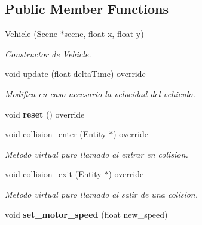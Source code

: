 \subsection*{Public Member Functions}
\begin{DoxyCompactItemize}
\item 
\mbox{\hyperlink{classexample_1_1_vehicle_a3ff0df156297d50fb261d04507486857}{Vehicle}} (\mbox{\hyperlink{classexample_1_1_scene}{Scene}} $\ast$\mbox{\hyperlink{classexample_1_1_entity_ab851dbde4a16829f9fb77ab9a66b9f1e}{scene}}, float x, float y)
\begin{DoxyCompactList}\small\item\em Constructor de \mbox{\hyperlink{classexample_1_1_vehicle}{Vehicle}}. \end{DoxyCompactList}\item 
void \mbox{\hyperlink{classexample_1_1_vehicle_a6fcb41bf4274c7bbc1fb0957b770d65a}{update}} (float delta\+Time) override
\begin{DoxyCompactList}\small\item\em Modifica en caso necesario la velocidad del vehiculo. \end{DoxyCompactList}\item 
\mbox{\label{classexample_1_1_vehicle_aefbbdc8bdab57675ff484baa9a1ff15c}} 
void {\bfseries reset} () override
\item 
void \mbox{\hyperlink{classexample_1_1_vehicle_af1a5fe70938e564d67b69487938f6f63}{collision\+\_\+enter}} (\mbox{\hyperlink{classexample_1_1_entity}{Entity}} $\ast$) override
\begin{DoxyCompactList}\small\item\em Metodo virtual puro llamado al entrar en colision. \end{DoxyCompactList}\item 
void \mbox{\hyperlink{classexample_1_1_vehicle_ae8eeaa80a8a50a6402b313efca1dadba}{collision\+\_\+exit}} (\mbox{\hyperlink{classexample_1_1_entity}{Entity}} $\ast$) override
\begin{DoxyCompactList}\small\item\em Metodo virtual puro llamado al salir de una colision. \end{DoxyCompactList}\item 
\mbox{\label{classexample_1_1_vehicle_ad870ec1cb64e8eef59182d444cce8050}} 
void {\bfseries set\+\_\+motor\+\_\+speed} (float new\+\_\+speed)
\end{DoxyCompactItemize}
